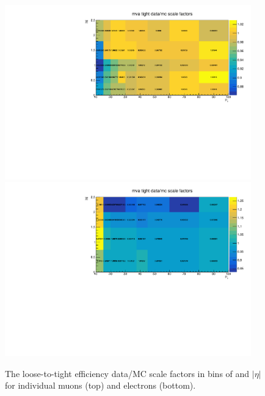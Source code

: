 \begin{figure}[hbtp]
 \begin{center}
   \includegraphics[width=0.95\textwidth]{ch4_figs/tight_mu_lepEff_SF.pdf}
   \includegraphics[width=0.95\textwidth]{ch4_figs/tight_ele_lepEff_SF.pdf}
   \caption[Lepton selection efficiency Data/MC scale factors]{The loose-to-tight efficiency data/MC scale factors in bins of \pt and $|\eta|$ for individual muons (top) and electrons (bottom).}
   \label{fig:tightLepEff}
   \end{center}
\end{figure}

